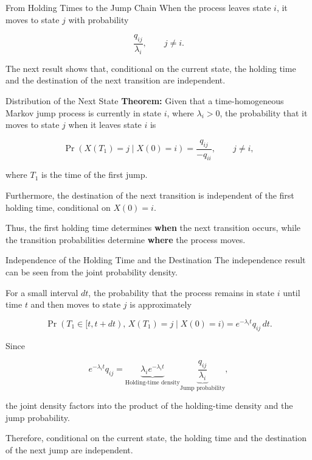 \documentclass[
  ignorenonframetext,
  aspectratio=169,
]{beamer}
\begin{document}
\begin{frame}{From Holding Times to the Jump Chain}
\protect{}\label{from-holding-times-to-the-jump-chain-1}
When the process leaves state \(i\), it moves to state \(j\) with
probability

\[
\frac{q_{ij}}{\lambda_i},\qquad j\neq i.
\]

The next result shows that, conditional on the current state, the
holding time and the destination of the next transition are independent.
\end{frame}

\begin{frame}{Distribution of the Next State}
\protect{}\label{distribution-of-the-next-state}
\textbf{Theorem:} Given that a time-homogeneous Markov jump process is
currently in state \(i\), where \(\lambda_i>0\), the probability that it
moves to state \(j\) when it leaves state \(i\) is

\[
\boxed{
\Pr(X(T_1)=j\mid X(0)=i)
=\frac{q_{ij}}{-q_{ii}},
\qquad j\neq i,
}
\]

where \(T_1\) is the time of the first jump.

Furthermore, the destination of the next transition is independent of
the first holding time, conditional on \(X(0)=i\).

Thus, the first holding time determines \textbf{when} the next
transition occurs, while the transition probabilities determine
\textbf{where} the process moves.
\end{frame}

\begin{frame}{Independence of the Holding Time and the Destination}
\protect{}\label{independence-of-the-holding-time-and-the-destination}
The independence result can be seen from the joint probability density.

For a small interval \(dt\), the probability that the process remains in
state \(i\) until time \(t\) and then moves to state \(j\) is
approximately

\[
\Pr(T_1\in[t,t+dt),\,X(T_1)=j\mid X(0)=i)
=
e^{-\lambda_i t}q_{ij}\,dt.
\]

Since

\[
e^{-\lambda_i t}q_{ij}
=
\underbrace{\lambda_i e^{-\lambda_i t}}_{\text{Holding-time density}}
\underbrace{\frac{q_{ij}}{\lambda_i}}_{\text{Jump probability}},
\]

the joint density factors into the product of the holding-time density
and the jump probability.

Therefore, conditional on the current state, the holding time and the
destination of the next jump are independent.
\end{frame}
\end{document}
